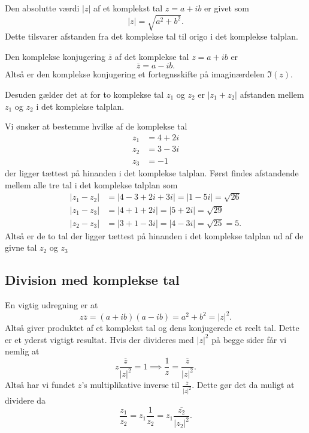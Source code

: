 \begin{definition} 
  Den absolutte værdi $|z|$ af et komplekst tal $z = a + ib$ er givet som
  \[ 
  |z| = \sqrt{a^2 + b^2}
  .\]
  Dette tilsvarer afstanden fra det komplekse tal til origo i det komplekse talplan.
\end{definition}

\begin{definition} 
  Den komplekse konjugering $\overline{z}$ af det komplekse tal $z = a + ib$ er
  \[ 
  \overline{z} = a -ib
  .\]
  Altså er den komplekse konjugering et fortegnsskifte på imaginærdelen $\Im(z)$.
\end{definition}

Desuden gælder det at for to komplekse tal $z_1$ og $z_2$ er $|z_1 + z_2|$ afstanden mellem $z_1$ og $z_2$ i det komplekse talplan.

\begin{eks} 
  Vi ønsker at bestemme hvilke af de komplekse tal
  \begin{align*}
  z_1 &= 4 + 2i \\
  z_2 &= 3-3i \\
  z_3 &= -1
  \end{align*}
  der ligger tættest på hinanden i det komplekse talplan.
  \bigbreak
  Først findes afstandende mellem alle tre tal i det komplekse talplan som
  \begin{align*}
    |z_1 - z_2| &= |4-3 + 2i + 3i| = |1 - 5i| = \sqrt{26} \\
    |z_1 - z_3| &= |4 + 1 + 2i| = |5 + 2i| = \sqrt{29} \\
    |z_2 - z_3| &= |3 + 1 - 3i| = |4 - 3i| = \sqrt{25} = 5
  .\end{align*}
  Altså er de to tal der ligger tættest på hinanden i det komplekse talplan ud af de givne tal $z_2$ og $z_3$
\end{eks}

\subsection{Division med komplekse tal}
En vigtig udregning er at
\[ 
z \overline{z} = (a+ib)(a-ib) = a^2 + b^2 = |z|^2
.\]
Altså giver produktet af et komplekst tal og dens konjugerede et reelt tal. Dette er et yderst vigtigt resultat. Hvis der divideres med $|z|^2$ på begge sider får vi nemlig at
\[ 
z \frac{\overline{z}}{|z|^2} = 1 \implies \frac{1}{z} = \frac{\overline{z}}{|z|^2}
.\]
Altså har vi fundet $z$'s multiplikative inverse til $\frac{\overline{z}}{|z|^2}$. Dette gør det da muligt at dividere da
\[ 
\frac{z_1}{z_2} = z_1 \frac{1}{z_2} = z_1 \frac{\overline{z_2}}{|z_2|^2}
.\]

